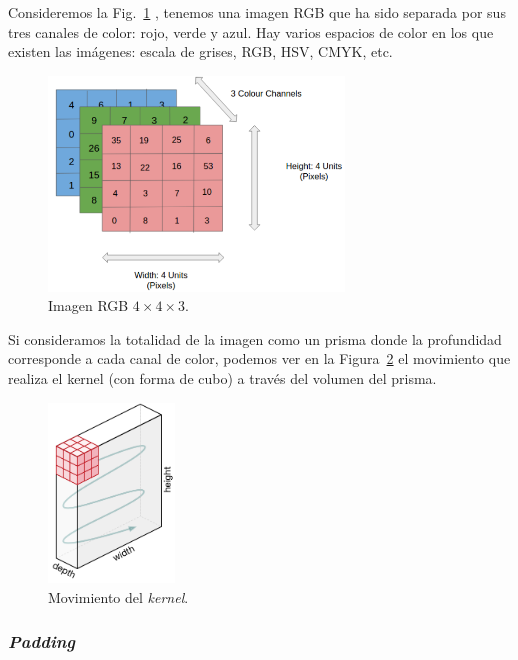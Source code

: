 \documentclass[a4paper,12pt]{article}
\begin{document}
Consideremos la Fig.~\ref{fig:conv2dimg} \citep{Saha2020Oct}, tenemos una imagen RGB que ha sido separada por sus tres canales de color: rojo, verde y azul. Hay varios espacios de color en los que existen las imágenes: escala de grises, RGB, HSV, CMYK, etc.

\begin{figure}[H]
	\begin{center}				
	\includegraphics[width=0.7\textwidth]{imgrgb.png}
  	\caption{Imagen RGB $4 \times 4 \times 3$.}
  	\label{fig:conv2dimg}
  	\end{center}
\end{figure}

Si consideramos la totalidad de la imagen como un prisma donde la profundidad corresponde a cada canal de color, podemos ver en la Figura~\ref{fig:kernelmove} el movimiento que realiza el kernel (con forma de cubo) a través del volumen del prisma.

\begin{figure}[H]
	\begin{center}				
	\includegraphics[width=0.3\textwidth]{kernelmove.png}
  	\caption{Movimiento del \textit{kernel}.}
  	\label{fig:kernelmove}
  	\end{center}
\end{figure}

\subsubsection{\textit{Padding}}
\end{document}
